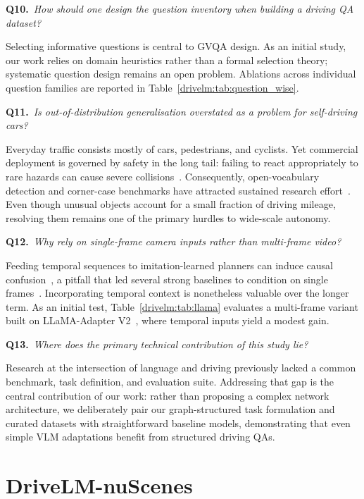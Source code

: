 \medskip\noindent\textbf{Q10.}~\emph{How should one design the question inventory when building a driving QA dataset?}

\noindent Selecting informative questions is central to GVQA design. As an initial study, our work relies on domain heuristics rather than a formal selection theory; systematic question design remains an open problem. Ablations across individual question families are reported in Table~\ref{drivelm:tab:question_wise}.

\medskip\noindent\textbf{Q11.}~\emph{Is out-of-distribution generalisation overstated as a problem for self-driving cars?}

\noindent Everyday traffic consists mostly of cars, pedestrians, and cyclists. Yet commercial deployment is governed by safety in the long tail: failing to react appropriately to rare hazards can cause severe collisions~\cite{2022incidentai}. Consequently, open-vocabulary detection and corner-case benchmarks have attracted sustained research effort~\cite{zareian2021openvocabulary,li2022coda}. Even though unusual objects account for a small fraction of driving mileage, resolving them remains one of the primary hurdles to wide-scale autonomy.

\medskip\noindent\textbf{Q12.}~\emph{Why rely on single-frame camera inputs rather than multi-frame video?}

\noindent Feeding temporal sequences to imitation-learned planners can induce causal confusion~\cite{wen2021keyframefocused}, a pitfall that led several strong baselines to condition on single frames~\cite{wu2022tcp,jaeger2023hidden}. Incorporating temporal context is nonetheless valuable over the longer term. As an initial test, Table~\ref{drivelm:tab:llama} evaluates a multi-frame variant built on LLaMA-Adapter V2~\cite{gao2023llamaadapterv2}, where temporal inputs yield a modest gain.

\medskip\noindent\textbf{Q13.}~\emph{Where does the primary technical contribution of this study lie?}

\noindent Research at the intersection of language and driving previously lacked a common benchmark, task definition, and evaluation suite. Addressing that gap is the central contribution of our work: rather than proposing a complex network architecture, we deliberately pair our graph-structured task formulation and curated datasets with straightforward baseline models, demonstrating that even simple VLM adaptations benefit from structured driving QAs.

\section{DriveLM-nuScenes}\label{drivelm:app:nuscenes}

